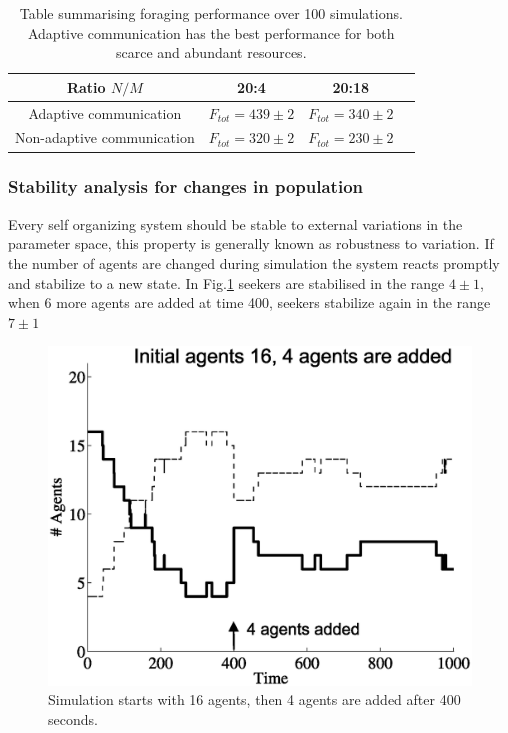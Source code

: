 \begin{table}
\renewcommand{\arraystretch}{1.3}
\caption[Foraging performance with limited resources]{
Table summarising foraging performance over 100 simulations.
Adaptive communication has the best performance for both scarce
and abundant resources.\label{tab:limitedperformance}}
\begin{center}
\begin{tabular}{@{}cccc@{}}
\hline
\hline
Ratio $N/M$ & 20:4 & 20:18\\
\hline
Adaptive communication & $F_{tot}=439\pm2$ & $F_{tot}=340\pm2$\\
\hline
Non-adaptive communication & $F_{tot}=320\pm2$ & $F_{tot}=230\pm2$\\
\end{tabular}
\end{center}
\end{table}

\subsubsection{Stability analysis for changes in population}
Every self organizing system should be stable to external variations in the 
parameter space, this property is generally known as robustness to variation.
If the number of agents are changed during simulation the system reacts promptly
and stabilize to a new state. In Fig.\ref{fig:agentAdd} seekers are stabilised
in the range $4\pm1$, when 6 more agents are added at time 400,
seekers stabilize again in the range $7\pm1$

\begin{figure}[htb]
\begin{centering}
\includegraphics[width=0.6 \textwidth]{figures/socialadapt/limited/agent4more.eps}
\small{
\caption[Self organisation sensitivity to agent parameters]{
Simulation starts with 16 agents, then 4 agents are added
after 400 seconds.\label{fig:agentAdd}}
}
\end{centering}
\end{figure}

